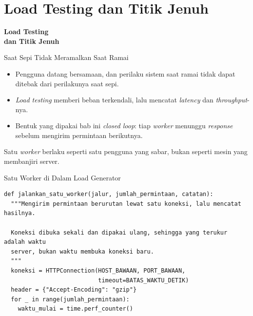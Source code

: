 \documentclass[aspectratio=169, table, 12pt]{beamer}
\begin{document}
\section{Load Testing dan Titik Jenuh}

\begin{frame}{\hfill}
  \centering
  \Huge{\textbf{Load Testing\\dan Titik Jenuh}}
\end{frame}

\begin{frame}{{\Large Saat Sepi Tidak Meramalkan Saat Ramai}}
  \vspace{14pt}
  \begin{itemize}
    \item Pengguna datang bersamaan, dan perilaku sistem saat ramai tidak
          dapat ditebak dari perilakunya saat sepi.
    \item \textit{Load testing} memberi beban terkendali, lalu mencatat
          \textit{latency} dan \textit{throughput}-nya.
    \item Bentuk yang dipakai bab ini \textit{closed loop}: tiap
          \textit{worker} menunggu \textit{response} sebelum mengirim permintaan
          berikutnya.
  \end{itemize}
  \vspace{8pt}
  {\footnotesize Satu \textit{worker} berlaku seperti satu pengguna yang
  sabar, bukan seperti mesin yang membanjiri server.}
\end{frame}

\begin{frame}[fragile]{{\Large Satu Worker di Dalam Load Generator}}
  \vspace{2pt}
\begin{lstlisting}[style=PythonStyle]
def jalankan_satu_worker(jalur, jumlah_permintaan, catatan):
  """Mengirim permintaan berurutan lewat satu koneksi, lalu mencatat hasilnya.

  Koneksi dibuka sekali dan dipakai ulang, sehingga yang terukur adalah waktu
  server, bukan waktu membuka koneksi baru.
  """
  koneksi = HTTPConnection(HOST_BAWAAN, PORT_BAWAAN,
                           timeout=BATAS_WAKTU_DETIK)
  header = {"Accept-Encoding": "gzip"}
  for _ in range(jumlah_permintaan):
    waktu_mulai = time.perf_counter()
\end{lstlisting}
\end{frame}
\end{document}
